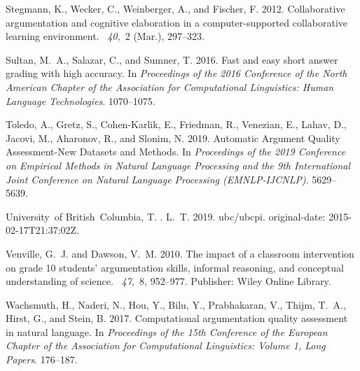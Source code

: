 \documentclass[notitlepage,12pt]{jedm}
\begin{document}
\begin{thebibliography}{}
{\sc Stegmann, K.}, {\sc Wecker, C.}, {\sc Weinberger, A.}, {\sc and} {\sc
  Fischer, F.} 2012.
\newblock Collaborative argumentation and cognitive elaboration in a
  computer-supported collaborative learning environment.
~{\em 40,\/}~2 (Mar.), 297--323.

{\sc Sultan, M.~A.}, {\sc Salazar, C.}, {\sc and} {\sc Sumner, T.} 2016.
\newblock Fast and easy short answer grading with high accuracy.
\newblock In {\em Proceedings of the 2016 {Conference} of the {North}
  {American} {Chapter} of the {Association} for {Computational} {Linguistics}:
  {Human} {Language} {Technologies}}. 1070--1075.

{\sc Toledo, A.}, {\sc Gretz, S.}, {\sc Cohen-Karlik, E.}, {\sc Friedman, R.},
  {\sc Venezian, E.}, {\sc Lahav, D.}, {\sc Jacovi, M.}, {\sc Aharonov, R.},
  {\sc and} {\sc Slonim, N.} 2019.
\newblock Automatic {Argument} {Quality} {Assessment}-{New} {Datasets} and
  {Methods}.
\newblock In {\em Proceedings of the 2019 {Conference} on {Empirical} {Methods}
  in {Natural} {Language} {Processing} and the 9th {International} {Joint}
  {Conference} on {Natural} {Language} {Processing} ({EMNLP}-{IJCNLP})}.
  5629--5639.

{\sc University~of British~Columbia, T. . L.~T.} 2019.
\newblock ubc/ubcpi.
\newblock original-date: 2015-02-17T21:37:02Z.

{\sc Venville, G.~J.} {\sc and} {\sc Dawson, V.~M.} 2010.
\newblock The impact of a classroom intervention on grade 10 students'
  argumentation skills, informal reasoning, and conceptual understanding of
  science.
~{\em 47,\/}~8,
  952--977.
\newblock Publisher: Wiley Online Library.

{\sc Wachsmuth, H.}, {\sc Naderi, N.}, {\sc Hou, Y.}, {\sc Bilu, Y.}, {\sc
  Prabhakaran, V.}, {\sc Thijm, T.~A.}, {\sc Hirst, G.}, {\sc and} {\sc Stein,
  B.} 2017.
\newblock Computational argumentation quality assessment in natural language.
\newblock In {\em Proceedings of the 15th {Conference} of the {European}
  {Chapter} of the {Association} for {Computational} {Linguistics}: {Volume} 1,
  {Long} {Papers}}. 176--187.


\end{thebibliography}
\end{document}
